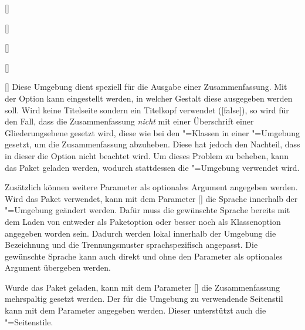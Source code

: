 \begin{Declaration}{[]}
\begin{Declaration}[v2.02]{}
\begin{Declaration}{[]}
\begin{Declaration}[v2.02]{%
  []%
}
\begin{Declaration}{[]}
\begin{Declaration}{[\PSet]}
\printdeclarationlist%
%
%
Diese Umgebung dient speziell für die Ausgabe einer Zusammenfassung. Mit der 
Option  kann eingestellt werden, in welcher Gestalt diese 
ausgegeben werden soll. Wird keine Titelseite sondern ein Titelkopf verwendet 
([false]), so wird für den Fall, dass die Zusammenfassung 
\emph{nicht} mit einer Überschrift einer Gliederungsebene gesetzt wird, diese 
wie bei den \KOMAScript"=Klassen in einer "=Umgebung 
gesetzt, um die Zusammenfassung abzuheben. Diese hat jedoch den Nachteil, dass 
in dieser die Option  nicht beachtet wird. Um dieses Problem zu 
beheben, kann das Paket  geladen werden, wodurch stattdessen 
die "=Umgebung verwendet wird.

Zusätzlich können weitere Parameter als optionales Argument angegeben werden. 
Wird das Paket  verwendet, kann mit dem Parameter 
[] die Sprache innerhalb 
der "=Umgebung geändert werden. Dafür muss die gewünschte 
Sprache bereits mit dem Laden von  entweder als Paketoption oder 
besser noch als Klassenoption angegeben worden sein. Dadurch werden lokal 
innerhalb der Umgebung die Bezeichnung  und die 
Trennungsmuster sprachspezifisch angepasst. Die gewünschte Sprache kann auch 
direkt und ohne den Parameter  als 
optionales Argument übergeben werden.

Wurde das Paket  geladen, kann mit dem Parameter 
[] die Zusammenfassung 
mehrspaltig gesetzt werden.
Der für die Umgebung zu verwendende Seitenstil kann mit dem Parameter 
 angegeben werden. Dieser unterstützt 
auch die "=Seitenstile.


\end{Declaration}
\end{Declaration}
\end{Declaration}
\end{Declaration}
\end{Declaration}
\end{Declaration}
